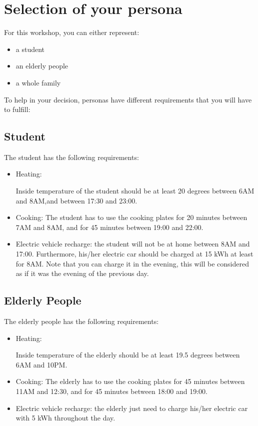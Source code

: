 \documentclass[a4paper, chapterprefix=true, openany]{scrbook}
\begin{document}
\section{Selection of your persona}
For this workshop, you can either represent:
\begin{itemize}
	\item a student
	\item an elderly people
	\item a whole family
\end{itemize}
		
	To help in your decision, personas have different requirements that you will have to fulfill:
	\subsection{Student}
	The student has the following requirements:
	\begin{itemize}
		\item Heating:
		
		Inside temperature of the student should be at least 20 degrees between 6AM and 8AM,and between 17:30 and 23:00. 
		
		\item Cooking:
		The student has to use the cooking plates for 20 minutes between 7AM and 8AM, and for 45 minutes between 19:00 and 22:00.
		
		\item Electric vehicle recharge: the student will not be at home between 8AM and 17:00. Furthermore, his/her electric car should be charged at 15 kWh at least for 8AM. Note that you can charge it in the evening, this will be considered as if it was the evening of the previous day.
	\end{itemize}
	
	
	\subsection{Elderly People}
	The elderly people has the following requirements:
	\begin{itemize}
		\item Heating:
		
		Inside temperature of the elderly should be at least 19.5 degrees between 6AM and 10PM. 
		
		\item Cooking:
		The elderly has to use the cooking plates for 45 minutes between 11AM and 12:30, and for 45 minutes between 18:00 and 19:00.
		
		\item Electric vehicle recharge: the elderly just need to charge his/her electric car with 5 kWh throughout the day.
	\end{itemize}
	
\end{document}
